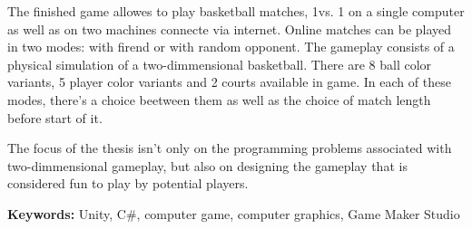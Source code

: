 The finished game allowes to play basketball matches, 1vs. 1 on a single computer as well as on two machines connecte via internet. Online matches can be played in two modes: with firend or with random opponent. The gameplay consists of a physical simulation of a two-dimmensional basketball.
There are 8 ball color variants, 5 player color variants and 2 courts available in game. In each of these modes, there's a choice beetween them as well as the choice of match length before start of it.

The focus of the thesis isn't only on the programming problems associated with two-dimmensional gameplay, but also on designing the gameplay that is considered fun to play by potential players.


\bigskip
{\noindent\bf Keywords:} Unity, C\#, computer game, computer graphics, Game Maker Studio

\vfill